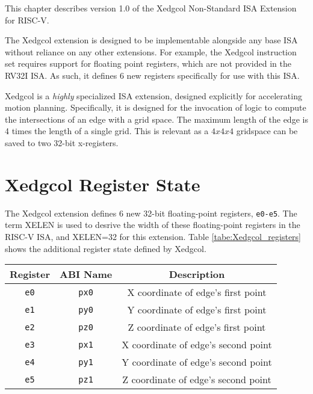 
This chapter describes version 1.0 of the Xedgcol Non-Standard ISA Extension for RISC-V.

The Xedgcol extension is designed to be implementable alongside any base ISA without reliance on any other extensions. For example, the Xedgcol instruction set requires support for floating point registers, which are not provided in the RV32I ISA. As such, it defines 6 new registers specifically for use with this ISA.

Xedgcol is a \textit{highly} specialized ISA extension, designed explicitly for accelerating motion planning.
Specifically, it is designed for the invocation of logic to compute the intersections of an edge with a grid space. The maximum length of the edge is 4 times the length of a single grid. This is relevant as a $4x4x4$ gridspace can be saved to two 32-bit x-registers.

\section{Xedgcol Register State}
The Xedgcol extension defines 6 new 32-bit floating-point registers, \texttt{e0-e5}. The term XELEN is used to desrive the width of these floating-point registers in the RISC-V ISA, and XELEN=32 for this extension.
Table \ref{tabe:Xedgcol_registers} shows the additional register state defined by Xedgcol. 
\begin{table}[H]
\begin{center}
\begin{tabular}{|c|c|c|}
\hline
\textbf{Register} & \textbf{ABI Name} & \textbf{Description} \\
\hline
\texttt{e0}     & \texttt{px0}      & X coordinate of edge's first point \\
\hline
\texttt{e1}     & \texttt{py0}      & Y coordinate of edge's first point \\
\hline
\texttt{e2}     & \texttt{pz0}      & Z coordinate of edge's first point \\
\hline
\texttt{e3}     & \texttt{px1}      & X coordinate of edge's second point \\
\hline
\texttt{e4}     & \texttt{py1}      & Y coordinate of edge's second point \\
\hline
\texttt{e5}     & \texttt{pz1}      & Z coordinate of edge's second point \\
\hline
\end{tabular}
\end{center}
\end{table}


